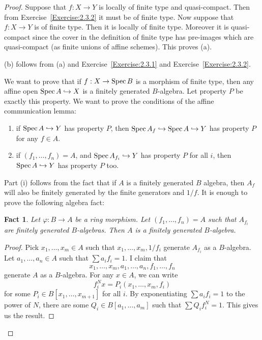 \documentclass[]{pcmi}
\theoremstyle{plain}
\newtheorem{Fact}[equation]{Fact}
\theoremstyle{definition}
\theoremstyle{remark}
\begin{document}
\begin{proof}
    Suppose that $f : X \to Y$ is locally of finite type and quasi-compact. Then from Exercise~\ref{Exercise:2.3.2} it must be of finite type. Now suppose that $f : X \to Y$ is of finite type. Then it is locally of finite type. Moreover it is quasi-compact since the cover in the definition of finite type has pre-images which are quasi-compact (as finite unions of affine schemes). This proves (a). 

    (b) follows from (a) and Exercise~\ref{Exercise:2.3.1} and Exercise~\ref{Exercise:2.3.2}. 

    We want to prove that if $f : X \to \operatorname{Spec} B$ is a morphism of finite type, then any affine open $\operatorname{Spec} A \hookrightarrow X$ is a finitely generated $B$-algebra. Let property $P$ be exactly this property. We want to prove the conditions of the affine communication lemma:
    \begin{enumerate}[label = (\roman*)]
        \item if $\operatorname{Spec} A \hookrightarrow Y$ has property $P$, then $\operatorname{Spec} A_f \hookrightarrow \operatorname{Spec} A \hookrightarrow Y$ has property $P$ for any $f \in A$. 
        \item if $(f_1, \ldots, f_n) = A$, and $\operatorname{Spec} A_{f_i} \hookrightarrow Y$ has property $P$ for all $i$, then $\operatorname{Spec} A \hookrightarrow Y$ has property $P$ too. 
    \end{enumerate}
    Part (i) follows from the fact that if $A$ is a finitely generated $B$ algebra, then $A_f$ will also be finitely generated by the finite generators and $1/f$. It is enough to prove the following algebra fact:
    \begin{Fact}
        Let $\varphi : B \to A$ be a ring morphism. Let $(f_1, \ldots, f_n) = A$ such that $A_{f_i}$ are finitely generated $B$-algebras. Then $A$ is a finitely generated $B$-algebra. 
    \end{Fact}
    \begin{proof}
        Pick $x_1, \ldots, x_m \in A$ such that $x_1, \ldots, x_m, 1/f_i$ generate $A_{f_i}$ as a $B$-algebra. Let $a_1, \ldots, a_n \in A$ such that $\sum a_i f_i = 1$. I claim that 
        \[
            x_1, \ldots, x_m, a_1, \ldots, a_n, f_1, \ldots, f_n
        \]
        generate $A$ as a $B$-algebra. For any $x \in A$, we can write 
        \[
            f_i^N x = P_i(x_1, \ldots, x_m, f_i)
        \]
        for some $P_i \in B[x_1, \ldots, x_{m+1}]$ for all $i$. By exponentiating $\sum a_i f_i = 1$ to the power of $N$, there are some $Q_i \in B[a_1, \ldots, a_m]$ such that $\sum Q_i f_i^N = 1$. This gives us the result. 
    \end{proof}
\end{proof}
\end{document}
